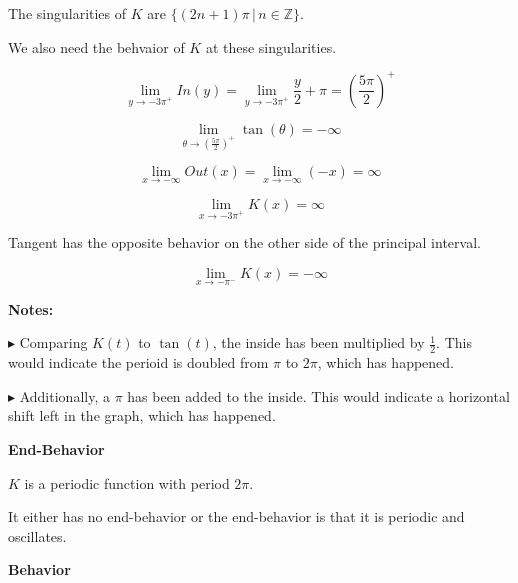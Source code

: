 \documentclass{ximera}
\begin{document}
The singularities of $K$ are $\{ (2n+1)\pi  \, | \, n \in \mathbb{Z}  \}$. 



We also need the behvaior of $K$ at these singularities. 



\[
\lim\limits_{y \to -3\pi^+} In(y) = \lim\limits_{y \to -3\pi^+} \frac{y}{2} + \pi = \left( \frac {5\pi}{2} \right)^+
\]




\[
\lim\limits_{\theta \to \left( \tfrac {5\pi}{2} \right)^+} \tan(\theta) = -\infty
\]




\[
\lim\limits_{x \to -\infty} Out(x) = \lim\limits_{x \to -\infty} (-x) = \infty
\]





\[
\lim\limits_{x \to -3\pi^+} K(x) = \infty
\]


Tangent has the opposite behavior on the other side of the principal interval. 






\[
\lim\limits_{x \to -\pi^-} K(x) = -\infty
\]




\textbf{Notes:} 


$\blacktriangleright$ Comparing $K(t)$ to $\tan(t)$, the inside has been multiplied by $\frac{1}{2}$.  This would indicate the perioid is doubled from $\pi$ to $2\pi$, which has happened.  

$\blacktriangleright$ Additionally, a $\pi$ has been added to the inside.  This would indicate a horizontal shift left in the graph, which has happened.














\textbf{\textcolor{blue!55!black}{End-Behavior}}


$K$ is a periodic function with period $2\pi$. 

It either has no end-behavior or the end-behavior is that it is periodic and oscillates.











\textbf{\textcolor{blue!55!black}{Behavior}}
\end{document}
